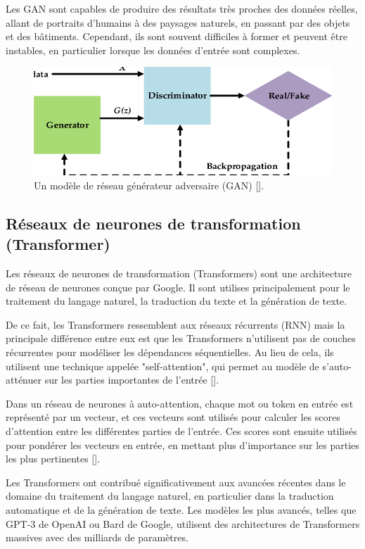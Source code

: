 \medskip
Les GAN sont capables de produire des résultats très proches des données réelles, allant de portraits d'humains à des paysages naturels, en passant par des objets et des bâtiments. Cependant, ils sont souvent difficiles à former et peuvent être instables, en particulier lorsque les données d'entrée sont complexes.

\begin{figure}[hbt!]
	\centering
	\includegraphics[width=12cm]{images_pfe/gan.png}
	\caption{Un modèle de réseau générateur adversaire (GAN) [\cite{feng_feng_chen_cao_zhang_jiao_yu_2020}].}
	\label{fig:gan}
\end{figure}
\FloatBarrier

\subsection{Réseaux de neurones de transformation (Transformer)}
Les réseaux de neurones de transformation (Transformers) sont une architecture
de réseau de neurones conçue par Google. Il sont utilises principalement pour
le traitement du langage naturel, la traduction du texte et la génération de
texte.

\medskip
De ce fait, les Transformers ressemblent aux réseaux récurrents (RNN) mais la principale différence entre eux est que les Transformers n'utilisent pas de couches récurrentes pour modéliser les dépendances séquentielles. Au lieu de cela, ils utilisent une technique appelée "self-attention", qui permet au modèle de s'auto-atténuer sur les parties importantes de l'entrée [\cite{attention_is_all_you_need}].

\medskip
Dans un réseau de neurones à auto-attention, chaque mot ou token en entrée est représenté par un vecteur, et ces vecteurs sont utilisés pour calculer les scores d'attention entre les différentes parties de l'entrée. Ces scores sont ensuite utilisés pour pondérer les vecteurs en entrée, en mettant plus d'importance sur les parties les plus pertinentes [\cite{attention_is_all_you_need}].

\medskip
Les Transformers ont contribué significativement aux avancées récentes dans le domaine du traitement du langage naturel, en particulier dans la traduction automatique et de la génération de texte. Les modèles les plus avancés, telles que GPT-3 de OpenAI ou Bard de Google, utilisent des architectures de Transformers massives avec des milliards de paramètres.

